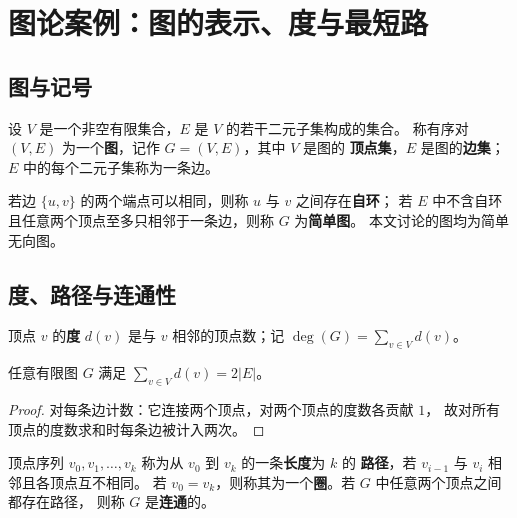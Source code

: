 %
\chapter{图论案例：图的表示、度与最短路}

\section{图与记号}

\begin{definition}[图]
设 $V$ 是一个非空有限集合，$E$ 是 $V$ 的若干二元子集构成的集合。
称有序对 $(V, E)$ 为一个\textbf{图}，记作 $G = (V, E)$，其中 $V$ 是图的
\textbf{顶点集}，$E$ 是图的\textbf{边集}；$E$ 中的每个二元子集称为一条边。
\end{definition}

\begin{remark}
若边 $\{u, v\}$ 的两个端点可以相同，则称 $u$ 与 $v$ 之间存在\textbf{自环}；
若 $E$ 中不含自环且任意两个顶点至多只相邻于一条边，则称 $G$ 为\textbf{简单图}。
本文讨论的图均为简单无向图。
\end{remark}

\section{度、路径与连通性}

\begin{definition}[度]
顶点 $v$ 的\textbf{度} $d(v)$ 是与 $v$ 相邻的顶点数；记 $\deg(G) = \sum_{v \in V} d(v)$。
\end{definition}

\begin{theorem}[握手定理]
任意有限图 $G$ 满足 $\sum_{v \in V} d(v) = 2|E|$。
\end{theorem}

\begin{proof}
对每条边计数：它连接两个顶点，对两个顶点的度数各贡献 $1$，
故对所有顶点的度数求和时每条边被计入两次。
\end{proof}

\begin{definition}[路径与连通]
顶点序列 $v_0, v_1, \dots, v_k$ 称为从 $v_0$ 到 $v_k$ 的一条\textbf{长度}为 $k$ 的
\textbf{路径}，若 $v_{i-1}$ 与 $v_i$ 相邻且各顶点互不相同。
若 $v_0 = v_k$，则称其为一个\textbf{圈}。若 $G$ 中任意两个顶点之间都存在路径，
则称 $G$ 是\textbf{连通}的。
\end{definition}

